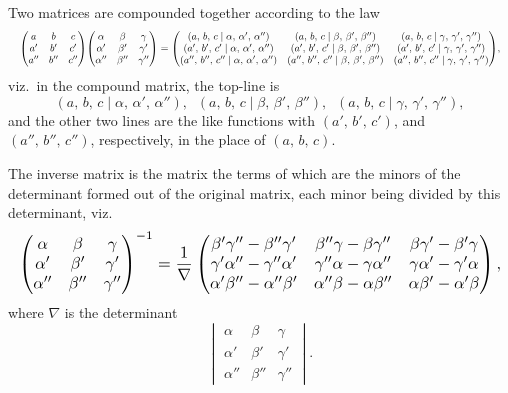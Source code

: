\documentclass[11pt]{article}
\begin{document}
\medskip

Two matrices are compounded together according to the law
\[
   \resizebox{\textwidth}{!}{$\displaystyle
   \begin{pmatrix} a & b & c \\ a' & b' & c' \\ a'' & b'' & c'' \end{pmatrix}\!
   \begin{pmatrix} \alpha & \beta & \gamma \\ \alpha' & \beta' & \gamma' \\ \alpha'' & \beta'' & \gamma'' \end{pmatrix}
   = \begin{pmatrix}
      (a,\, b,\, c \mid \alpha,\, \alpha',\, \alpha'') & (a,\, b,\, c \mid \beta,\, \beta',\, \beta'') & (a,\, b,\, c \mid \gamma,\, \gamma',\, \gamma'')\\
      (a',\, b',\, c' \mid \alpha,\, \alpha',\, \alpha'') & (a',\, b',\, c' \mid \beta,\, \beta',\, \beta'') & (a',\, b',\, c' \mid \gamma,\, \gamma',\, \gamma'')\\
      (a'',\, b'',\, c'' \mid \alpha,\, \alpha',\, \alpha'') & (a'',\, b'',\, c'' \mid \beta,\, \beta',\, \beta'') & (a'',\, b'',\, c'' \mid \gamma,\, \gamma',\, \gamma'')
   \end{pmatrix}\!,$}
\]
viz.\ in the compound matrix, the top-line is
\[
   (a,\, b,\, c \mid \alpha,\, \alpha',\, \alpha''),\;\; (a,\, b,\, c \mid \beta,\, \beta',\, \beta''),\;\; (a,\, b,\, c \mid \gamma,\, \gamma',\, \gamma''),
\]
and the other two lines are the like functions with $(a',\, b',\, c')$, and $(a'',\, b'',\, c'')$, respectively, in the place of $(a,\, b,\, c)$.

\medskip

The inverse matrix is the matrix the terms of which are the minors of the
determinant formed out of the original matrix, each minor being divided by this
determinant, viz.\
\[
   \resizebox{\textwidth}{!}{$\displaystyle
   \begin{pmatrix} \alpha & \beta & \gamma \\ \alpha' & \beta' & \gamma' \\ \alpha'' & \beta'' & \gamma'' \end{pmatrix}^{-1}
   = \frac{1}{\nabla}\begin{pmatrix}
      \beta'\gamma'' - \beta''\gamma' & \beta''\gamma - \beta\gamma'' & \beta\gamma' - \beta'\gamma\\
      \gamma'\alpha'' - \gamma''\alpha' & \gamma''\alpha - \gamma\alpha'' & \gamma\alpha' - \gamma'\alpha\\
      \alpha'\beta'' - \alpha''\beta' & \alpha''\beta - \alpha\beta'' & \alpha\beta' - \alpha'\beta
   \end{pmatrix},$}
\]
where $\nabla$ is the determinant
\[
   \begin{vmatrix} \alpha & \beta & \gamma \\ \alpha' & \beta' & \gamma' \\ \alpha'' & \beta'' & \gamma'' \end{vmatrix}.
\]
\end{document}

